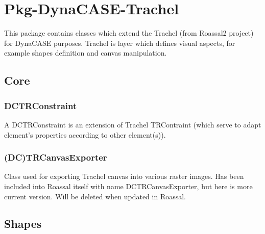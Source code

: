 \documentclass[a4paper,10pt,twoside]{book}
\begin{document}
\chapter{ Pkg-DynaCASE-Trachel}
This package contains classes which extend the Trachel (from Roassal2 project) for DynaCASE purposes.
Trachel is layer which defines visual aspects, for example shapes definition and canvas manipulation.
\section{ Core}\subsection{ DCTRConstraint}
A DCTRConstraint is an extension of Trachel TRContraint (which serve to adapt element's properties according to other element(s)).
\subsection{ (DC)TRCanvasExporter}
Class used for exporting Trachel canvas into various raster images.
Has been included into Roassal itself with name DCTRCanvasExporter, but here is more current version. Will be deleted when updated in Roassal.
\section{ Shapes}




\printindex
\end{document}
